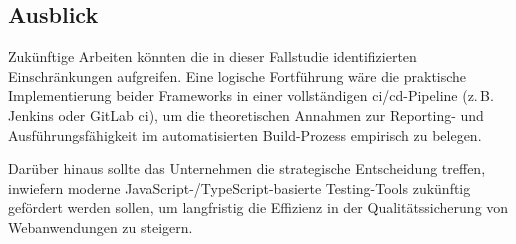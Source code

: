 \subsection{Ausblick}
\label{sec:ausblick}

Zukünftige Arbeiten könnten die in dieser Fallstudie identifizierten Einschränkungen aufgreifen. Eine logische Fortführung wäre die praktische Implementierung beider Frameworks in einer vollständigen \gls{ci}/\gls{cd}-Pipeline (z.\,B. Jenkins oder GitLab \gls{ci}), um die theoretischen Annahmen zur Reporting- und Ausführungsfähigkeit im automatisierten Build-Prozess empirisch zu belegen. 

Darüber hinaus sollte das Unternehmen die strategische Entscheidung treffen, inwiefern moderne JavaScript-/TypeScript-basierte Testing-Tools zukünftig gefördert werden sollen, um langfristig die Effizienz in der Qualitätssicherung von Webanwendungen zu steigern.


